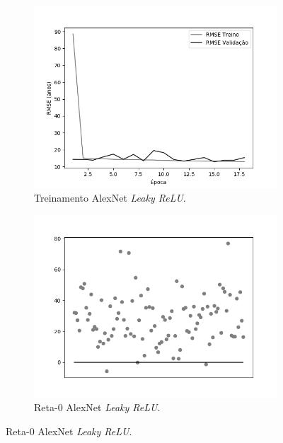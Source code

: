 \begin{figure}[hb!]
\begin{subfigure}[hb]{0.5\linewidth}
		\end{subfigure}\\
		\begin{subfigure}[hb]{0.5\linewidth}
			\caption{Treinamento AlexNet \emph{Leaky ReLU}.}
			\label{fig:histalexlrelunorm}
			\centering
			\includegraphics[width=\linewidth]{img/graficos/history/alexnet/fig-history-image-treat-2-alexnet-lrelu-rmse.png}
		\end{subfigure}
		\begin{subfigure}[hb]{0.5\linewidth}
			\caption{Reta-0 AlexNet \emph{Leaky ReLU}.}
			\label{fig:redeneuralbiologica}
			\includegraphics[width=\linewidth]{img/graficos/reta0/alexnet/fig-reta-0-image-treat-2-alexnet-lrelu.png}
		\end{subfigure}%
	\end{figure}


